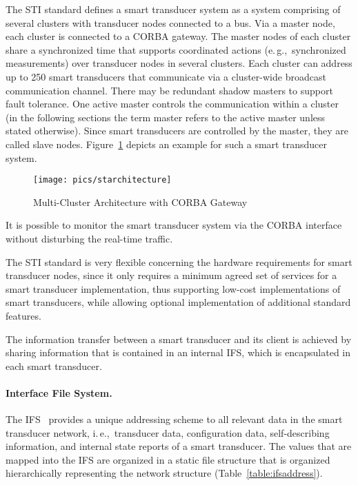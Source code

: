 \documentclass[11pt,a4paper,]{article}
\def\ie{i.\,e.,~}
\def\eg{e.\,g.,~}
\begin{document}
The STI standard defines a smart transducer system as a system
comprising of several clusters with transducer nodes connected to
a bus. Via a master node, each cluster is connected to a CORBA
gateway. The master nodes of each cluster share a synchronized
time that supports coordinated actions (\eg synchronized
measurements) over transducer nodes in several clusters.
Each cluster can address up to 250 smart transducers that
communicate via a cluster-wide broadcast communication channel.
There may be redundant shadow masters to support fault tolerance.
One active master controls the communication within a cluster (in
the following sections the term master refers to the active master
unless stated otherwise). Since smart transducers are controlled
by the master, they are called slave nodes.
Figure~\ref{fig:starchitecture} depicts an example for such a
smart transducer system.

\begin{figure}[htb]
\begin{center}
  \texttt{[image: pics/starchitecture]}
  \caption{Multi-Cluster Architecture with CORBA Gateway}
  \label{fig:starchitecture}
\end{center}
\end{figure}

It is possible to monitor the smart transducer system via the
CORBA interface without disturbing the real-time traffic.

The STI standard is very flexible concerning the hardware
requirements for smart transducer nodes, since it only requires a
minimum agreed set of services for a smart transducer
implementation, thus supporting low-cost implementations of smart
transducers, while allowing optional implementation of additional
standard features.

The information transfer between a smart transducer and its client
is achieved by sharing information that is contained in an internal
\ac{IFS}, which is encapsulated in each smart transducer.

\paragraph{Interface File System.}
The \ac{IFS}~\cite{holzmann:01} provides a unique addressing scheme
to all relevant data in the smart transducer network, \ie transducer
data, configuration data, self-describing information, and internal
state reports of a smart transducer. The values that are mapped into
the \ac{IFS} are organized in a static file structure that is
organized hierarchically representing the network structure
(Table~\ref{table:ifsaddress}).
\end{document}
